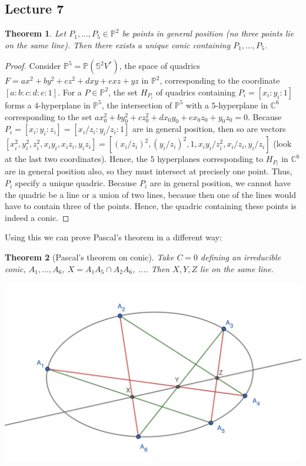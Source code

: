 \documentclass[12pt]{article}
\newcommand{\C}{\mathbb{C}}
\renewcommand{\P}{\mathbb{P}}
\renewcommand{\S}{\mathbb{S}}
\newtheorem{theorem}{Theorem}[section]
\begin{document}
    \subsection{Lecture 7}
    \begin{theorem}
        Let $P_1, \dots, P_5 \in \P^2$ be points in general position (no three points lie on the same line). Then there exists a unique conic containing $P_1, \dots, P_5$.
    \end{theorem}
    \begin{proof}
        Consider $\P^5 = \P(\S^2V^*)$, the space of quadrics $F = ax^2 + by^2 + cz^2 + dxy + exz + yz$ in $\P^2$, corresponding to the coordinate $[a:b:c:d:e:1]$. For a $P \in \P^2$, the set $H_{P_i}$ of quadrics containing $P_i = [x_i:y_i:1]$ forms a $4$-hyperplane in $\P^5$, the intersection of $\P^5$ with a $5$-hyperplane in $\C^6$ corresponding to the set $ax_0^2 + by_0^2 + cz_0^2 + dx_0y_0 + ex_0z_0 + y_0z_0 = 0$. Because $P_i = [x_i: y_i: z_i] = [x_i/z_i: y_i/z_i: 1]$ are in general position, then so are vectors $[x_i^2, y_i^2, z_i^2, x_iy_i, x_iz_i, y_iz_i] = [(x_i/z_i)^2, (y_i/z_i)^2, 1, x_iy_i/z_i^2, x_i/z_i, y_i/z_i]$ (look at the last two coordinates). Hence, the $5$ hyperplanes corresponding to $H_{P_i}$ in $\C^6$ are in general position also, so they must intersect at precisely one point. Thus, $P_i$ specify a unique quadric. Because $P_i$ are in general position, we cannot have the quadric be a line or a union of two lines, because then one of the lines would have to contain three of the points. Hence, the quadric containing these points is indeed a conic.
    \end{proof}
    Using this we can prove Pascal's theorem in a different way:
    \begin{theorem}
        [Pascal's theorem on conic] Take $C = 0$ defining an irreducible conic, $A_1, \dots, A_6$, $X = A_1A_5 \cap A_2A_6$, .... Then $X, Y, Z$ lie on the same line.
        \begin{center}
            \includegraphics[width = 0.7\linewidth]{pascal_pf.png}
        \end{center}
    \end{theorem}
\end{document}
